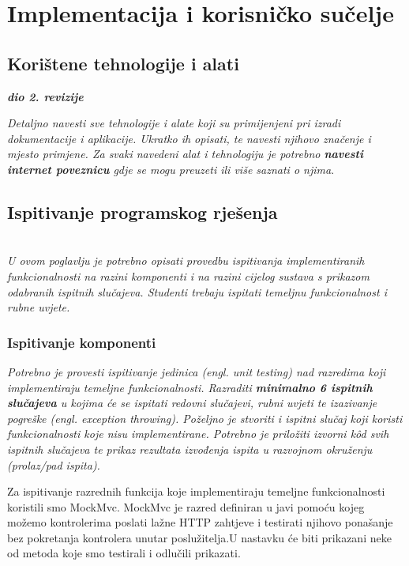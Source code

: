 \chapter{Implementacija i korisničko sučelje}
		
		
		\section{Korištene tehnologije i alati}
		
			\textbf{\textit{dio 2. revizije}}
			
			 \textit{Detaljno navesti sve tehnologije i alate koji su primijenjeni pri izradi dokumentacije i aplikacije. Ukratko ih opisati, te navesti njihovo značenje i mjesto primjene. Za svaki navedeni alat i tehnologiju je potrebno \textbf{navesti internet poveznicu} gdje se mogu preuzeti ili više saznati o njima}.
			
			
			\eject 
		
	
		\section{Ispitivanje programskog rješenja}
			
			\textbf{}\\
			
			 \textit{U ovom poglavlju je potrebno opisati provedbu ispitivanja implementiranih funkcionalnosti na razini komponenti i na razini cijelog sustava s prikazom odabranih ispitnih slučajeva. Studenti trebaju ispitati temeljnu funkcionalnost i rubne uvjete.}
	
			
			\subsection{Ispitivanje komponenti}
			\textit{Potrebno je provesti ispitivanje jedinica (engl. unit testing) nad razredima koji implementiraju temeljne funkcionalnosti. Razraditi \textbf{minimalno 6 ispitnih slučajeva} u kojima će se ispitati redovni slučajevi, rubni uvjeti te izazivanje pogreške (engl. exception throwing). Poželjno je stvoriti i ispitni slučaj koji koristi funkcionalnosti koje nisu implementirane. Potrebno je priložiti izvorni kôd svih ispitnih slučajeva te prikaz rezultata izvođenja ispita u razvojnom okruženju (prolaz/pad ispita). }
			
			Za ispitivanje razrednih funkcija koje implementiraju temeljne funkcionalnosti koristili smo MockMvc. MockMvc je razred definiran u javi pomoću kojeg možemo kontrolerima poslati lažne HTTP zahtjeve i testirati njihovo  ponašanje bez pokretanja kontrolera unutar poslužitelja.U nastavku će biti prikazani neke od metoda koje smo testirali i odlučili prikazati.
			
